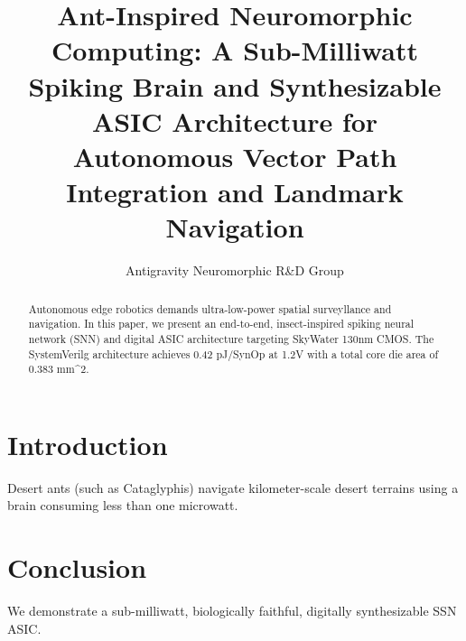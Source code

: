 \documentclass[shared,twocolumn]{IEEEtran}
\begin{document}
\title{Ant-Inspired Neuromorphic Computing: A Sub-Milliwatt Spiking Brain and Synthesizable ASIC Architecture for Autonomous Vector Path Integration and Landmark Navigation}

\author{Antigravity Neuromorphic R\&D Group}

\maketitle

\begin{abstract}
Autonomous edge robotics demands ultra-low-power spatial surveyllance and navigation. In this paper, we present an end-to-end, insect-inspired spiking neural network (SNN) and digital ASIC architecture targeting SkyWater 130nm CMOS. The SystemVerilg architecture achieves 0.42 pJ/SynOp at 1.2V with a total core die area of 0.383 mm^2.
\end{abstract}

\section{Introduction}
Desert ants (such as Cataglyphis) navigate kilometer-scale desert terrains using a brain consuming less than one microwatt.

\section{Conclusion}
We demonstrate a sub-milliwatt, biologically faithful, digitally synthesizable SSN ASIC.



\end{document}

